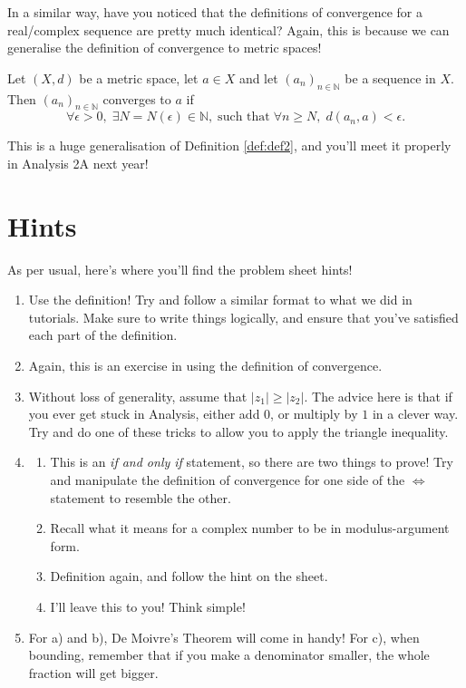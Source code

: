 \documentclass[
  10pt,
  a4paper]{article}
\providecommand{\tightlist}{%
  \setlength{\itemsep}{0pt}\setlength{\parskip}{0pt}}
\theoremstyle{plain}
\theoremstyle{definition}
\theoremstyle{plain}
\theoremstyle{plain}
\theoremstyle{plain}
\theoremstyle{plain}
\theoremstyle{definition}
\theoremstyle{definition}
\theoremstyle{remark}
\theoremstyle{remark}
\let\BeginKnitrBlock\begin \let\EndKnitrBlock\end
\begin{document}
In a similar way, have you noticed that the definitions of convergence for a real/complex sequence are pretty much identical? Again, this is because we can generalise the definition of convergence to metric spaces!

\BeginKnitrBlock{definition}[Convergence]
{\label{def:def4} }Let \((X,d)\) be a metric space, let \(a \in X\) and let \((a_n)_{n\in\mathbb{N}}\) be a sequence in \(X\). Then \((a_n)_{n\in\mathbb{N}}\) converges to \(a\) if \[\forall \epsilon > 0, \; \exists N = N(\epsilon) \in \mathbb{N}, \; \text{such that} \; \forall n \geq N, \; d(a_n,a) < \epsilon.\]
\EndKnitrBlock{definition}

This is a huge generalisation of Definition \ref{def:def2}, and you'll meet it properly in Analysis 2A next year!

\hypertarget{hints}{%
\section{Hints}\label{hints}}

As per usual, here's where you'll find the problem sheet hints!

\begin{enumerate}
\def\labelenumi{\arabic{enumi}.}
\item
  Use the definition! Try and follow a similar format to what we did in tutorials. Make sure to write things logically, and ensure that you've satisfied each part of the definition.
\item
  Again, this is an exercise in using the definition of convergence.
\item
  Without loss of generality, assume that \(\lvert z_1 \rvert \geq \lvert z_2 \rvert.\) The advice here is that if you ever get stuck in Analysis, either add \(0\), or multiply by \(1\) in a clever way. Try and do one of these tricks to allow you to apply the triangle inequality.
\item
  \begin{enumerate}
  \def\labelenumii{\alph{enumii})}
  \tightlist
  \item
    This is an \emph{if and only if} statement, so there are two things to prove! Try and manipulate the definition of convergence for one side of the \(\Leftrightarrow\) statement to resemble the other.
  \item
    Recall what it means for a complex number to be in modulus-argument form.
  \item
    Definition again, and follow the hint on the sheet.
  \item
    I'll leave this to you! Think simple!
  \end{enumerate}
\item
  For a) and b), De Moivre's Theorem will come in handy! For c), when bounding, remember that if you make a denominator smaller, the whole fraction will get bigger.
\end{enumerate}
\end{document}
